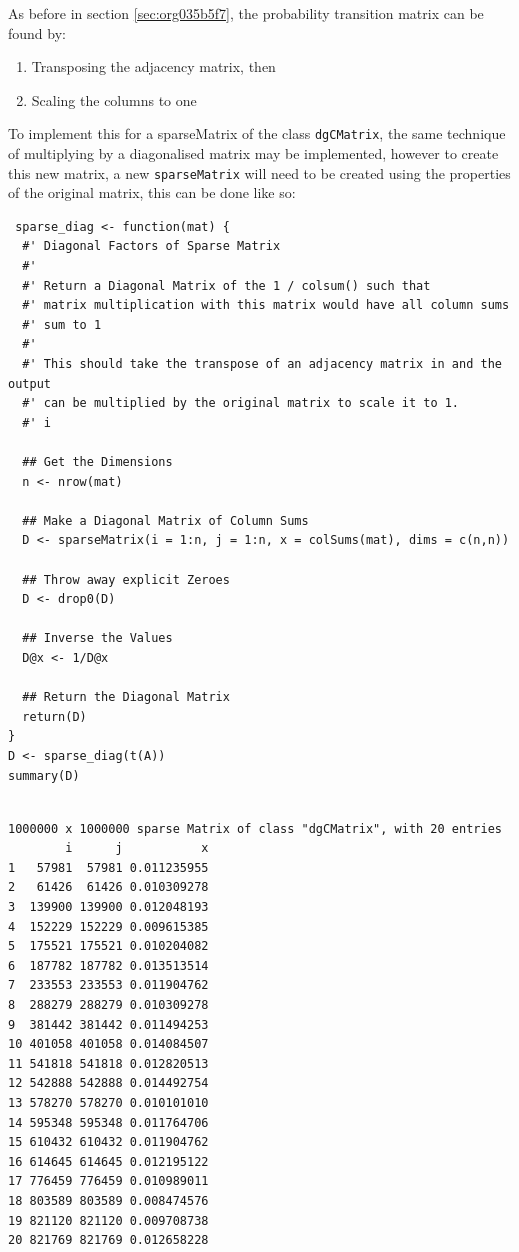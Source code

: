 \documentclass[11pt]{article}
\begin{document}
As before in section \ref{sec:org035b5f7}, the probability transition matrix can be found by:

\begin{enumerate}
\item Transposing the adjacency matrix, then
\item Scaling the columns to one
\end{enumerate}

To implement this for a sparseMatrix of the class \texttt{dgCMatrix}, the same technique of multiplying by a diagonalised matrix may be implemented, however to create this new matrix, a new \texttt{sparseMatrix} will need to be created using the properties of the original matrix, this can be done like so:


\begin{verbatim}
 sparse_diag <- function(mat) {
  #' Diagonal Factors of Sparse Matrix
  #'
  #' Return a Diagonal Matrix of the 1 / colsum() such that
  #' matrix multiplication with this matrix would have all column sums
  #' sum to 1
  #'
  #' This should take the transpose of an adjacency matrix in and the output
  #' can be multiplied by the original matrix to scale it to 1.
  #' i

  ## Get the Dimensions
  n <- nrow(mat)

  ## Make a Diagonal Matrix of Column Sums
  D <- sparseMatrix(i = 1:n, j = 1:n, x = colSums(mat), dims = c(n,n))

  ## Throw away explicit Zeroes
  D <- drop0(D)

  ## Inverse the Values
  D@x <- 1/D@x

  ## Return the Diagonal Matrix
  return(D)
}
D <- sparse_diag(t(A))
summary(D)
\end{verbatim}

\begin{verbatim}

1000000 x 1000000 sparse Matrix of class "dgCMatrix", with 20 entries
        i      j           x
1   57981  57981 0.011235955
2   61426  61426 0.010309278
3  139900 139900 0.012048193
4  152229 152229 0.009615385
5  175521 175521 0.010204082
6  187782 187782 0.013513514
7  233553 233553 0.011904762
8  288279 288279 0.010309278
9  381442 381442 0.011494253
10 401058 401058 0.014084507
11 541818 541818 0.012820513
12 542888 542888 0.014492754
13 578270 578270 0.010101010
14 595348 595348 0.011764706
15 610432 610432 0.011904762
16 614645 614645 0.012195122
17 776459 776459 0.010989011
18 803589 803589 0.008474576
19 821120 821120 0.009708738
20 821769 821769 0.012658228
\end{verbatim}
\end{document}
